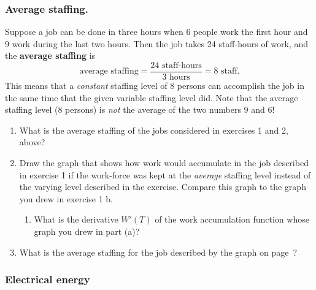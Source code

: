 \subsubsection{Average staffing.}
Suppose a job can be done in three hours when 6 people work the first hour and 9 work during the last two hours.  Then the job takes 24 staff-hours of work, and the {\bf average staffing} is
\[
\text{average staffing} = \dfrac{24 \text{ staff-hours}}{3 \text{ hours}} 
	= 8 \text{ staff}.
\]
This means that a {\em constant\/} staffing level of 8 persons can accomplish the job in the same time that the given variable staffing level did.  Note that the average staffing level (8 persons) is {\em not} the average of the two numbers 9 and 6!  


\begin{enumerate}
\item What is the average staffing of the jobs considered in exercises 1 and 2, above?


\item Draw the graph that shows how work would accumulate in the job described in exercise 1 if the work-force was kept at the {\em average\/} staffing level instead of the varying level described in the exercise.  Compare this graph to the graph you drew in exercise 1 b.

  \begin{enumerate}
  \item What is the derivative $W'(T)$ of the work accumulation function whose graph you drew in part (a)?


\end{enumerate}
\item What is the average staffing for the job described by the graph on page~\pageref{graph2}?


\end{enumerate}
\subsubsection{Electrical energy}
\label{subsubsec:electrical-energy}



